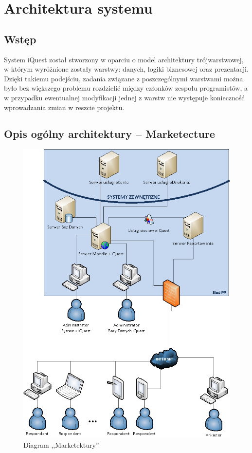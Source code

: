 \chapter{Architektura systemu}
\label{Chapter5}

\section{Wstęp}
\label{Chapter51}

System iQuest został stworzony w oparciu o model architektury trójwarstwowej, w którym wyróżnione zostały warstwy: danych, logiki biznesowej oraz prezentacji. Dzięki takiemu podejściu, zadania związane z poszczególnymi warstwami można było bez większego problemu rozdzielić między członków zespołu programistów, a w przypadku ewentualnej modyfikacji jednej z warstw nie występuje konieczność wprowadzania zmian w reszcie projektu.

\section{Opis ogólny architektury -- Marketecture}
\label{Chapter52}

\begin{figure}[H]
\centering\includegraphics[width=15cm]{figures/marketecture}
\caption{Diagram ,,Marketektury''}\label{rys:marketecture}
\end{figure}

